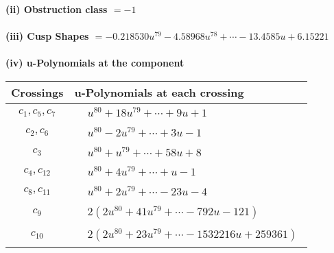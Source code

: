 \documentclass[1p]{elsarticle_modified}
\theoremstyle{definition}
\begin{document}
\flushleft \textbf{(ii) Obstruction class $= -1$}\\~\\
\flushleft \textbf{(iii) Cusp Shapes $= -0.218530 u^{79}-4.58968 u^{78}+\cdots-13.4585 u+6.15221$}\\~\\
\newpage\renewcommand{\arraystretch}{1}
\flushleft \textbf{(iv) u-Polynomials at the component}\newline \\
\begin{tabular}{m{50pt}|m{274pt}}
Crossings & \hspace{64pt}u-Polynomials at each crossing \\
\hline $$\begin{aligned}c_{1},c_{5},c_{7}\end{aligned}$$&$\begin{aligned}
&u^{80}+18 u^{79}+\cdots+9 u+1
\end{aligned}$\\
\hline $$\begin{aligned}c_{2},c_{6}\end{aligned}$$&$\begin{aligned}
&u^{80}-2 u^{79}+\cdots+3 u-1
\end{aligned}$\\
\hline $$\begin{aligned}c_{3}\end{aligned}$$&$\begin{aligned}
&u^{80}+u^{79}+\cdots+58 u+8
\end{aligned}$\\
\hline $$\begin{aligned}c_{4},c_{12}\end{aligned}$$&$\begin{aligned}
&u^{80}+4 u^{79}+\cdots+u-1
\end{aligned}$\\
\hline $$\begin{aligned}c_{8},c_{11}\end{aligned}$$&$\begin{aligned}
&u^{80}+2 u^{79}+\cdots-23 u-4
\end{aligned}$\\
\hline $$\begin{aligned}c_{9}\end{aligned}$$&$\begin{aligned}
&2(2 u^{80}+41 u^{79}+\cdots-792 u-121)
\end{aligned}$\\
\hline $$\begin{aligned}c_{10}\end{aligned}$$&$\begin{aligned}
&2(2 u^{80}+23 u^{79}+\cdots-1532216 u+259361)
\end{aligned}$\\
\hline
\end{tabular}\\~\\
\end{document}
